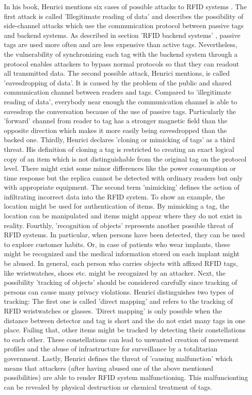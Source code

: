 In his book, Henrici mentions six cases of possible attacks to RFID systems \cite[p.61 ff.]{henrici}. The first attack is called 'Illegitimate reading of data' and describes the possibility of side-channel attacks which use the communication protocol between passive tags and backend systems. As described in section 'RFID backend systems' \pageref{backend}, passive tags are used more often and are less expensive than active tags. Nevertheless, the vulnerability of synchronizing each tag with the backend system through a protocol enables attackers to bypass normal protocols so that they can readout all transmitted data.
The second possible attack, Henrici mentions, is called 'eavesdropping of data'. It is caused by the problem of the public and shared communication channel between readers and tags. Compared to 'illegitimate reading of data', everybody near enough the communication channel is able to eavesdrop the conversation because of the use of passive tags. Particularly the 'forward' channel from reader to tag has a stronger magnetic field than the opposite direction which makes it more easily being eavesdropped than the backed one. 
Thirdly, Henrici declares 'cloning or mimicking of tags' as a third threat. His definition of cloning a tag is restricted to creating an exact logical copy of an item which is not distinguishable from the original tag on the protocol level. There might exist some minor differences like the power consumption or time response but the replica cannot be detected with ordinary readers but only with appropriate equipment. The second term 'mimicking' defines the action of infiltrating incorrect data into the RFID system. To show an example, the location might be used for authentication of items. By mimicking a tag, the location can be manipulated and items might appear where they do not exist in reality.
Fourthly, 'recognition of objects' represents another possible threat of RFID systems. In particular, when persons have been detected, they can be used to explore customer habits. Or, in case of patients who wear implants, these might be recognized and the medical information stored on each implant might be abused. In general, each person who carries objects with affixed RFID tags, like wristwatches, shoes etc. might be recognized by an attacker.
Next, the possibility 'tracking of objects' should be considered carefully since tracking of persons can cause many privacy violations. Henrici distinguishes two types of tracking: The first one is called 'direct mapping' and refers to the tracking of RFID wristwatches or glasses. 'Direct mapping' is only possible when the distance between detector and tag is short and the do not exist many tags in one place. Failing that, other items might be tracked by detecting their constellations to each other. These constellations can lead to unwanted creation of movement profiles and the abuse of infrastructure for surveillance by a totalitarian government.
Lastly, Henrici defines the threat of 'causing malfunction' which means that attackers (after having abused one of the above mentioned possibilities) are able to render RFID system malfunctioning. This malfuncionting can be revealed by physical destruction or chemical treatment of tags.  

